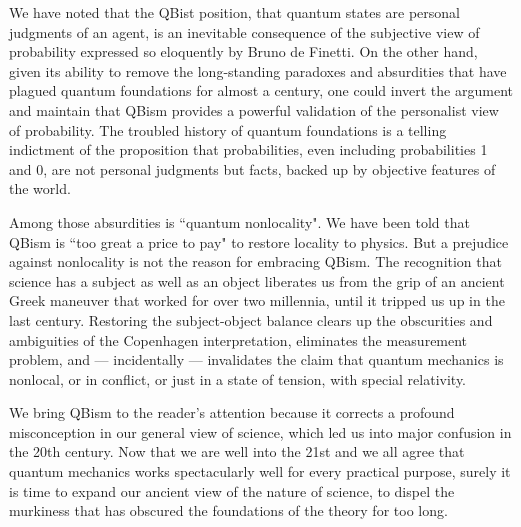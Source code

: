 \documentclass[aps,prb,superscriptaddress,12pt,tightenlines,nofootinbib]{revtex4-2}
\begin{document}
We have noted that the QBist position, that quantum states are personal judgments of an agent, is an inevitable consequence of the subjective view of probability expressed so eloquently by Bruno de Finetti.
On the other hand, given its ability to remove the long-standing paradoxes and absurdities that have plagued  quantum foundations for almost a century, one could invert the argument and maintain that QBism  provides a powerful validation of the personalist view of probability.    The troubled history of quantum foundations  is a telling indictment of the  proposition that probabilities, even including probabilities 1 and 0, are not personal judgments but facts, backed up by objective features of the world.

Among those absurdities is ``quantum  nonlocality".  We have been told that QBism is ``too great a price to pay" to restore locality to physics.     But a prejudice against nonlocality is not the reason for embracing QBism.   The recognition that science has a subject as well as an object liberates us from the grip of an ancient Greek maneuver that worked for over two millennia, until it tripped us up in the last  century.   Restoring the subject-object balance  clears up the obscurities and ambiguities of the Copenhagen interpretation, eliminates the measurement problem, and --- incidentally --- invalidates the claim that quantum mechanics is nonlocal, or in conflict, or just in a state of tension, with special relativity.

We bring QBism to the reader's attention because it corrects a profound misconception  in our  general view of science, which led us into major confusion in the 20th century.   Now that we are well into the 21st  and we all agree that quantum mechanics works spectacularly well for every practical purpose,  surely it is  time to expand our ancient view of the nature of science, to dispel the murkiness that has obscured the foundations of the theory for too long.
\end{document}
